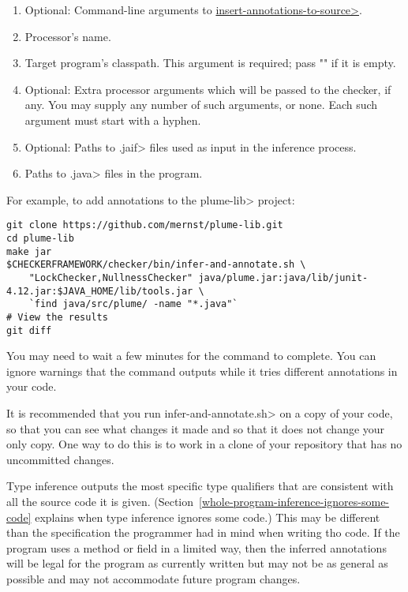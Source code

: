 \begin{enumerate}
\item Optional: Command-line arguments to
  \href{https://checkerframework.org/annotation-file-utilities/#insert-annotations-to-source}{\<insert-annotations-to-source>}.
\item Processor's name.
\item Target program's classpath.  This argument is required; pass "" if it
  is empty.
\item Optional: Extra processor arguments which will be passed to the checker, if any.
  You may supply any number of such arguments, or none.  Each such argument
  must start with a hyphen.
\item Optional: Paths to \<.jaif> files used as input in the inference
    process.
\item Paths to \<.java> files in the program.
\end{enumerate}

For example, to add annotations to the \<plume-lib> project:
\begin{Verbatim}
git clone https://github.com/mernst/plume-lib.git
cd plume-lib
make jar
$CHECKERFRAMEWORK/checker/bin/infer-and-annotate.sh \
    "LockChecker,NullnessChecker" java/plume.jar:java/lib/junit-4.12.jar:$JAVA_HOME/lib/tools.jar \
    `find java/src/plume/ -name "*.java"`
# View the results
git diff
\end{Verbatim}

You may need to wait a few minutes for the command to complete.
You can ignore warnings that the command outputs while it tries different
annotations in your code.

It is recommended that you run \<infer-and-annotate.sh> on a copy of your
code, so that you can see what changes it made and so that it does not
change your only copy.  One way to do this is to work in a clone of your
repository that has no uncommitted changes.



Type inference outputs the most specific type qualifiers that are
consistent with all the source code it is given.
(Section~\ref{whole-program-inference-ignores-some-code}
explains when type inference ignores some code.)
This may be different than the specification the programmer had in mind
when writing tho code.
If the program uses a method or field in a limited way, then the inferred
annotations will be legal for the program as
currently written but may not be as general as possible and may not
accommodate future program changes.

